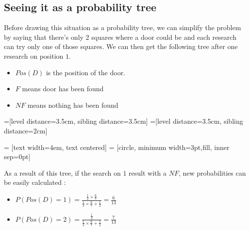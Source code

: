 \documentclass{article}
\begin{document}
\subsection{Seeing it as a probability tree}
Before drawing this situation as a probability tree, we can simplify the
problem by saying that there's only 2 squares where a door could be and each
research can try only one of those squares.
We can then get the following tree after one research on position $1$.
\begin{itemize}
\item $Pos(D)$ is the position of the door.
\item $F$ means door has been found
\item $NF$ means nothing has been found
\end{itemize}
=[level distance=3.5cm, sibling distance=3.5cm]
=[level distance=3.5cm, sibling distance=2cm]

 = [text width=4em, text centered]
 = [circle, minimum width=3pt,fill, inner sep=0pt]
\begin{center}
\end{center}

As a result of this tree, if the search on $1$ result with a $NF$, new
probabilities can be easily calculated :
\begin{itemize}
\item $P(Pos(D) = 1) = \frac{\frac{1}{2} \times \frac{6}{7}}
                            {\frac{1}{2} \times \frac{6}{7} +
                             \frac{1}{2}}
                     = \frac{6}{13}$
\item $P(Pos(D) = 2) = \frac{\frac{1}{2}}
                            {\frac{1}{2} \times \frac{6}{7} +
                             \frac{1}{2}}
                     = \frac{7}{13}$
\end{itemize}
\end{document}
